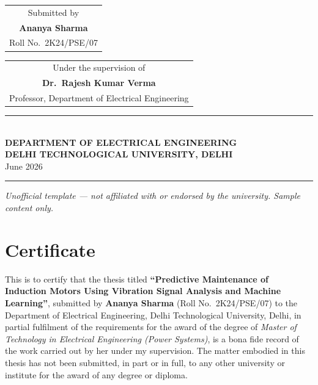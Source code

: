 \documentclass[12pt,a4paper]{report}
\begin{document}
\begin{titlepage}
\vspace{1.0cm}
\begin{tabular}{c}
{\normalsize\color{black!70} Submitted by} \\[6pt]
{\Large\bfseries\color{dtumaroon} Ananya Sharma} \\[2pt]
{\normalsize\color{black!70} Roll No.\ 2K24/PSE/07}
\end{tabular}

\vspace{1.0cm}
\begin{tabular}{c}
{\normalsize\color{black!70} Under the supervision of} \\[6pt]
{\large\bfseries\color{dtunavy} Dr.\ Rajesh Kumar Verma} \\[2pt]
{\normalsize\color{black!70} Professor, Department of Electrical Engineering}
\end{tabular}

\vfill

{\color{dtugold}\rule{0.55\textwidth}{1pt}}\\[6pt]
{\bfseries\color{dtunavy} DEPARTMENT OF ELECTRICAL ENGINEERING}\\[2pt]
{\bfseries\color{dtunavy} DELHI TECHNOLOGICAL UNIVERSITY, DELHI}\\[2pt]
{\color{black!70} June 2026}

\vspace{0.9cm}
\noindent\rule{\textwidth}{0.4pt}
\footnotesize\itshape
Unofficial template --- not affiliated with or endorsed by the university. Sample content only.

\restoregeometry
\end{titlepage}

\pagestyle{plain}
\chapter*{Certificate}

This is to certify that the thesis titled \textbf{``Predictive Maintenance of Induction Motors
Using Vibration Signal Analysis and Machine Learning''}, submitted by \textbf{Ananya Sharma}
(Roll No.\ 2K24/PSE/07) to the Department of Electrical Engineering, Delhi Technological
University, Delhi, in partial fulfilment of the requirements for the award of the degree of
\textit{Master of Technology in Electrical Engineering (Power Systems)}, is a bona fide record
of the work carried out by her under my supervision. The matter embodied in this thesis has not
been submitted, in part or in full, to any other university or institute for the award of any
degree or diploma.
\end{document}
